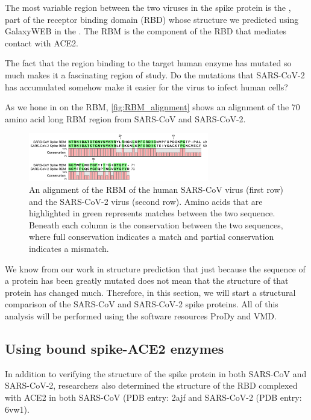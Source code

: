The most variable region between the two viruses in the spike protein is the , part of the receptor binding domain (RBD) whose structure we predicted using GalaxyWEB in the . The RBM is the component of the RBD that mediates contact with ACE2.

The fact that the region binding to the target human enzyme has mutated so much makes it a fascinating region of study. Do the mutations that SARS-CoV-2 has accumulated somehow make it easier for the virus to infect human cells?

As we hone in on the RBM, \autoref{fig:RBM_alignment} shows an alignment of the 70 amino acid long RBM region from SARS-CoV and SARS-CoV-2.

\begin{figure}[h]
	\centering
	\mySfFamily
	\includegraphics[width = 0.7\textwidth]{../images/RBM_alignment.png}
	\caption{An alignment of the RBM of the human SARS-CoV virus (first row) and the SARS-CoV-2 virus (second row). Amino acids that are highlighted in green represents matches between the two sequence. Beneath each column is the conservation between the two sequences, where full conservation indicates a match and partial conservation indicates a mismatch.}
	\label{fig:RBM_alignment}
\end{figure}

We know from our work in structure prediction that just because the sequence of a protein has been greatly mutated does not mean that the structure of that protein has changed much. Therefore, in this section, we will start a structural comparison of the SARS-CoV and SARS-CoV-2 spike proteins. All of this analysis will be performed using the software resources ProDy and VMD.

\FloatBarrier
{}
\subsection{Using bound spike-ACE2 enzymes}

In addition to verifying the structure of the spike protein in both SARS-CoV and SARS-CoV-2, researchers also determined the structure of the RBD complexed with ACE2 in both SARS-CoV (PDB entry: 2ajf and SARS-CoV-2 (PDB entry: 6vw1).\\

